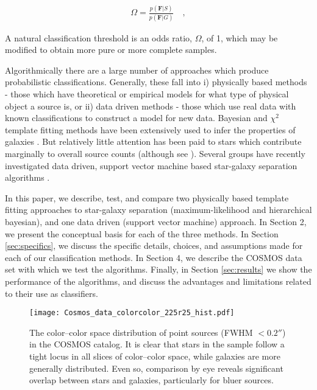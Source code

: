 \documentclass[12pt,preprint]{aastex}
\newcommand{\datavector}[1]{\boldsymbol{#1}}
\begin{document}
\begin{eqnarray}\displaystyle
\Omega = \frac{p(\datavector{F}|S)}{p(\datavector{F}|G)} 
\quad ,
\label{eqn:oddsratio}
\end{eqnarray}

\noindent A natural classification threshold is an odds ratio,
$\Omega$, of 1, which may be modified to obtain more pure or more
complete samples.

Algorithmically there are a large number of approaches which produce
probabilistic classifications.  Generally, these fall into i)
physically based methods - those which have theoretical or empirical
models for what type of physical object a source is, or ii) data
driven methods - those which use real data with known classifications
to construct a model for new data.  Bayesian and $\chi^2$ template
fitting methods have been extensively used to infer the properties of
galaxies \citep[e.g.][]{coil04a, ilbert09, xia09,
  walcher11a,hildebrandt10}. But relatively little attention has been
paid to stars which contribute marginally to overall source counts
(although see \citealt{robin07}).  Several groups have recently
investigated data driven, support vector machine based star-galaxy
separation algorithms \citep[e.g.][]{saglia12,solarz12,tsalmantza12a}.

In this paper, we describe, test, and compare two physically based
template fitting approaches to star-galaxy separation
(maximum-likelihood and hierarchical bayesian), and one data driven
(support vector machine) approach.  In Section 2, we present the
conceptual basis for each of the three methods.  In Section
\ref{sec:specifics}, we discuss the specific details, choices, and
assumptions made for each of our classification methods.  In Section
4, we describe the COSMOS data set with which we test the algorithms.
Finally, in Section \ref{sec:results} we show the performance of the
algorithms, and discuss the advantages and limitations related to
their use as classifiers.

\begin{figure}
\centering
\texttt{[image: Cosmos\_data\_colorcolor\_225r25\_hist.pdf]}
\caption{The color--color space distribution of point sources (FWHM $<
  0.2''$) in the COSMOS catalog.  It is clear that stars in the sample
  follow a tight locus in all slices of color--color space, while
  galaxies are more generally distributed.  Even so, comparison by eye
  reveals significant overlap between stars and galaxies, particularly
  for bluer sources.}
\label{fig:color-color-data}
\end{figure}
\end{document}
